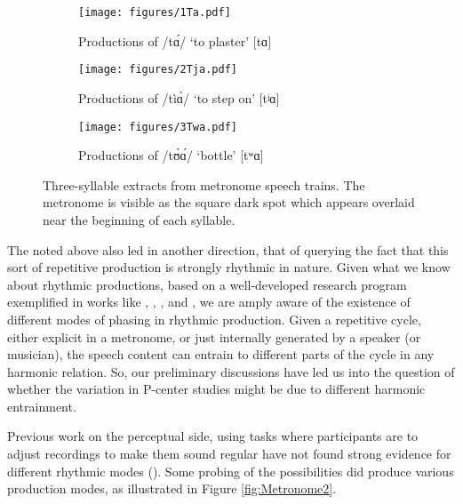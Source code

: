 \documentclass[output=paper,colorlinks,citecolor=brown]{langscibook}
\begin{document}
\begin{figure}  
    \centering
    \begin{subfigure}[h]{\textwidth}
        \centering
        \texttt{[image: figures/1Ta.pdf]}
        \caption{Productions of /tɑ́/ ‘to plaster’ [tɑ]}
    \end{subfigure}
    \hfill
    \begin{subfigure}[h]{\textwidth}
        \centering
        \texttt{[image: figures/2Tja.pdf]}
        \caption{Productions of /tìɑ̀/ ‘to step on’ [tʲɑ]}
    \end{subfigure}
    \begin{subfigure}[h]{\textwidth}
        \centering
        \texttt{[image: figures/3Twa.pdf]}
        \caption{Productions of /tʊ̀ɑ́/ ‘bottle’ [tʷɑ]}
    \end{subfigure}
    \caption{Three-syllable extracts from metronome speech trains. The metronome is visible as the square dark spot which appears overlaid near the beginning of each syllable.}
     \label{fig:Metronome1}
\end{figure}

The  noted above also led in another direction, that of querying the fact that this sort of repetitive production is strongly rhythmic in nature. Given what we know about rhythmic productions, based on a well-developed research program exemplified in works like \citet{CumminsPort1998}, \citet{Cummins2009}, \citet{Taijma1998}, and \citet{Anderson2018}, we are amply aware of the existence of different modes of phasing in rhythmic production. Given a repetitive cycle, either explicit in a metronome, or just internally generated by a speaker (or musician), the speech content can entrain to different parts of the cycle in any harmonic relation. So, our preliminary discussions have led us into the question of whether the variation in P-center studies might be due to different harmonic entrainment. 

Previous work on the perceptual side, using tasks where participants are to adjust recordings to make them sound regular have not found strong evidence for different  rhythmic modes (\cite{Whalenetal1991}). Some probing of the possibilities did produce various production modes, as illustrated in Figure \ref{fig:Metronome2}. 
\end{document}
